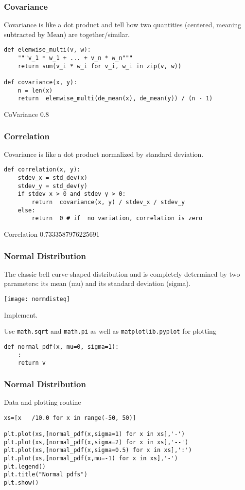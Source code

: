 \begin{frame}[fragile]\frametitle{Covariance}
Covariance is like a dot product and tell how two quantities (centered, meaning subtracted by Mean) are together/similar.
\begin{lstlisting}
def elemwise_multi(v, w):
    """v_1 * w_1 + ... + v_n * w_n"""
    return sum(v_i * w_i for v_i, w_i in zip(v, w))

def covariance(x, y):
	n = len(x)
	return	elemwise_multi(de_mean(x), de_mean(y)) / (n - 1)

\end{lstlisting}
CoVariance 0.8
\end{frame}

\begin{frame}[fragile]\frametitle{Correlation}
Covariance is like a dot product normalized by standard deviation.
\begin{lstlisting}
def correlation(x, y):
	stdev_x = std_dev(x)
  	stdev_y = std_dev(y)
	if stdev_x > 0 and stdev_y > 0:
		return	covariance(x, y) / stdev_x / stdev_y
	else:
		return	0 # if	no variation, correlation is zero
\end{lstlisting}
Correlation 0.7333587976225691
\end{frame}


\begin{frame}[fragile]\frametitle{Normal Distribution}
The classic bell curve-shaped distribution and is completely determined by two parameters: its mean (mu) and its standard deviation	 (sigma).
\begin{center}
\texttt{[image: normdisteq]}
\end{center}
Implement. 

Use \lstinline|math.sqrt| and \lstinline|math.pi| as well as \lstinline|matplotlib.pyplot| for plotting
\begin{lstlisting}
def normal_pdf(x, mu=0, sigma=1):
	:
	return v
\end{lstlisting}
\end{frame}

\begin{frame}[fragile]\frametitle{Normal Distribution}
Data and plotting routine
\begin{lstlisting}
xs=[x	/10.0 for x in range(-50, 50)]

plt.plot(xs,[normal_pdf(x,sigma=1) for x in xs],'-')
plt.plot(xs,[normal_pdf(x,sigma=2) for x in xs],'--')
plt.plot(xs,[normal_pdf(x,sigma=0.5) for x in xs],':')
plt.plot(xs,[normal_pdf(x,mu=-1) for x in xs],'-')
plt.legend()
plt.title("Normal pdfs")
plt.show()
\end{lstlisting}
\end{frame}

